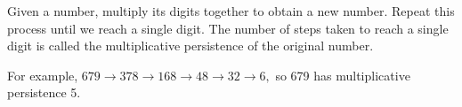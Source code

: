  Given a number, multiply its digits together to obtain
a new number. Repeat this process until we reach a single 
digit. The number of steps taken to reach a single digit
is called the multiplicative persistence of the original number.
\par
For example, $ 679 \to 378 \to 168 \to 48 \to 32 \to 6 , $
so 679 has multiplicative persistence 5.
